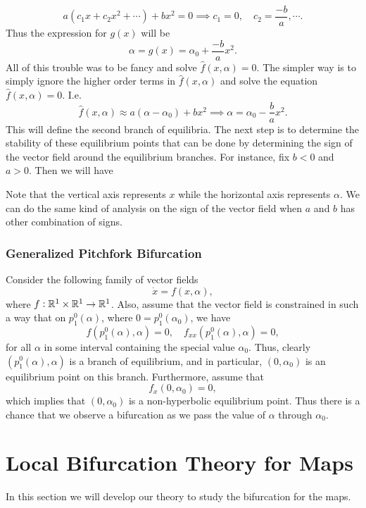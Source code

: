 \[ a(c_1x + c_2x^2 + \cdots) + bx^2 = 0 \implies c_1 = 0,\quad c_2 = \frac{-b}{a}, \cdots. \]
Thus the expression for $g(x)$ will be
\[ \alpha = g(x) = \alpha_0 + \frac{-b}{a}x^2 . \]
All of this trouble was to be fancy and solve $\hat{f}(x,\alpha)=0$. The simpler way is to simply ignore the higher order terms in $\hat{f}(x,\alpha)$ and solve the equation $\hat{f}(x,\alpha)=0$. I.e.
\[ \hat{f}(x,\alpha) \approx a(\alpha-\alpha_0) + bx^2 \implies \alpha = \alpha_0 -\frac{b}{a} x^2. \]
This will define the second branch of equilibria. The next step is to determine the stability of these equilibrium points that can be done by determining the sign of the vector field around the equilibrium branches. For instance, fix $b<0$ and $a>0$. Then we will have

\FloatBarrier
Note that the vertical axis represents $x$ while the horizontal axis represents $\alpha$. We can do the same kind of analysis on the sign of the vector field when $a$ and $b$ has other combination of signs.

\subsubsection*{Generalized Pitchfork Bifurcation}
Consider the following family of vector fields
\[ \dot{x} = f(x,\alpha), \]
where $f: \mathbb{R}^1 \times \mathbb{R}^1 \to \mathbb{R}^1$. Also, assume that the vector field is constrained in such a way that on $p^0_1(\alpha)$, where $0 = p^0_1(\alpha_0)$, we have
\[ f(p^0_1(\alpha),\alpha) = 0,\quad f_{xx}(p^0_1(\alpha),\alpha) = 0, \]
for all $\alpha$ in some interval containing the special value $\alpha_0$. Thus, clearly $(p^0_1(\alpha),\alpha)$ is a branch of equilibrium, and in particular, $(0,\alpha_0)$ is an equilibrium point on this branch. Furthermore, assume that 
\[ f_x(0,\alpha_0) = 0, \] 
which implies that $(0,\alpha_0)$ is a non-hyperbolic equilibrium point. Thus there is a chance that we observe a bifurcation as we pass the value of $\alpha$ through $\alpha_0$.


 
\section{Local Bifurcation Theory for Maps}
In this section we will develop our theory to study the bifurcation for the maps.

